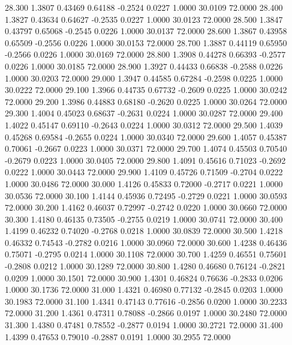   28.300   1.3807   0.43469   0.64188  -0.2524   0.0227   1.0000  30.0109  72.0000
  28.400   1.3827   0.43634   0.64627  -0.2535   0.0227   1.0000  30.0123  72.0000
  28.500   1.3847   0.43797   0.65068  -0.2545   0.0226   1.0000  30.0137  72.0000
  28.600   1.3867   0.43958   0.65509  -0.2556   0.0226   1.0000  30.0153  72.0000
  28.700   1.3887   0.44119   0.65950  -0.2566   0.0226   1.0000  30.0169  72.0000
  28.800   1.3908   0.44278   0.66393  -0.2577   0.0226   1.0000  30.0185  72.0000
  28.900   1.3927   0.44433   0.66838  -0.2588   0.0226   1.0000  30.0203  72.0000
  29.000   1.3947   0.44585   0.67284  -0.2598   0.0225   1.0000  30.0222  72.0000
  29.100   1.3966   0.44735   0.67732  -0.2609   0.0225   1.0000  30.0242  72.0000
  29.200   1.3986   0.44883   0.68180  -0.2620   0.0225   1.0000  30.0264  72.0000
  29.300   1.4004   0.45023   0.68637  -0.2631   0.0224   1.0000  30.0287  72.0000
  29.400   1.4022   0.45147   0.69110  -0.2643   0.0224   1.0000  30.0312  72.0000
  29.500   1.4039   0.45268   0.69584  -0.2655   0.0224   1.0000  30.0340  72.0000
  29.600   1.4057   0.45387   0.70061  -0.2667   0.0223   1.0000  30.0371  72.0000
  29.700   1.4074   0.45503   0.70540  -0.2679   0.0223   1.0000  30.0405  72.0000
  29.800   1.4091   0.45616   0.71023  -0.2692   0.0222   1.0000  30.0443  72.0000
  29.900   1.4109   0.45726   0.71509  -0.2704   0.0222   1.0000  30.0486  72.0000
  30.000   1.4126   0.45833   0.72000  -0.2717   0.0221   1.0000  30.0536  72.0000
  30.100   1.4144   0.45936   0.72495  -0.2729   0.0221   1.0000  30.0593  72.0000
  30.200   1.4162   0.46037   0.72997  -0.2742   0.0220   1.0000  30.0660  72.0000
  30.300   1.4180   0.46135   0.73505  -0.2755   0.0219   1.0000  30.0741  72.0000
  30.400   1.4199   0.46232   0.74020  -0.2768   0.0218   1.0000  30.0839  72.0000
  30.500   1.4218   0.46332   0.74543  -0.2782   0.0216   1.0000  30.0960  72.0000
  30.600   1.4238   0.46436   0.75071  -0.2795   0.0214   1.0000  30.1108  72.0000
  30.700   1.4259   0.46551   0.75601  -0.2808   0.0212   1.0000  30.1289  72.0000
  30.800   1.4280   0.46680   0.76124  -0.2821   0.0209   1.0000  30.1501  72.0000
  30.900   1.4301   0.46824   0.76636  -0.2833   0.0206   1.0000  30.1736  72.0000
  31.000   1.4321   0.46980   0.77132  -0.2845   0.0203   1.0000  30.1983  72.0000
  31.100   1.4341   0.47143   0.77616  -0.2856   0.0200   1.0000  30.2233  72.0000
  31.200   1.4361   0.47311   0.78088  -0.2866   0.0197   1.0000  30.2480  72.0000
  31.300   1.4380   0.47481   0.78552  -0.2877   0.0194   1.0000  30.2721  72.0000
  31.400   1.4399   0.47653   0.79010  -0.2887   0.0191   1.0000  30.2955  72.0000

